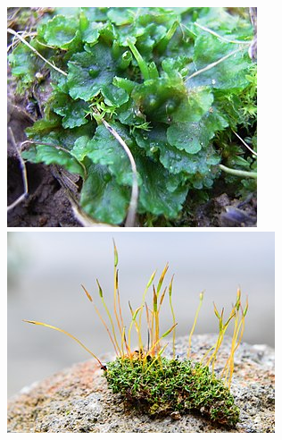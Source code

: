 \documentclass[11pt]{beamer}
\begin{document}
\begin{frame}
\begin{columns}[T]
\begin{figure}
		\end{figure}
		\begin{figure}
			\centering
			\includegraphics[height=0.25\textheight, width=\textwidth]{Phaeoceros_laevis.jpg}
			\includegraphics[height=0.25\textheight, width=\textwidth]{Moss_Gametophytes_Sporophytes.JPG}

\end{figure}
\end{columns}
\end{frame}
\end{document}
